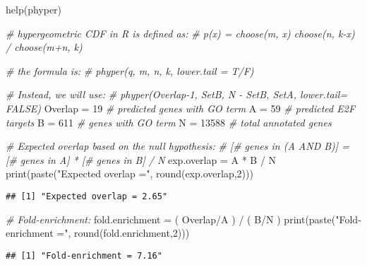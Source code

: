 \documentclass[
]{article}
\newenvironment{Shaded}{\begin{snugshade}}{\end{snugshade}}
\newcommand{\CommentTok}[1]{\textcolor[rgb]{0.56,0.35,0.01}{\textit{#1}}}
\newcommand{\DecValTok}[1]{\textcolor[rgb]{0.00,0.00,0.81}{#1}}
\newcommand{\FunctionTok}[1]{\textcolor[rgb]{0.00,0.00,0.00}{#1}}
\newcommand{\NormalTok}[1]{#1}
\newcommand{\OtherTok}[1]{\textcolor[rgb]{0.56,0.35,0.01}{#1}}
\newcommand{\SpecialCharTok}[1]{\textcolor[rgb]{0.00,0.00,0.00}{#1}}
\newcommand{\StringTok}[1]{\textcolor[rgb]{0.31,0.60,0.02}{#1}}
\begin{document}
\begin{Shaded}
\begin{Highlighting}[]
\FunctionTok{help}\NormalTok{(phyper)}

\CommentTok{\# hypergeometric CDF in R is defined as: }
\CommentTok{\#   p(x) = choose(m, x) choose(n, k{-}x) / choose(m+n, k)}

\CommentTok{\# the formula is:}
\CommentTok{\#   phyper(q, m, n, k, lower.tail = T/F)}

\CommentTok{\# Instead, we will use: }
\CommentTok{\#   phyper(Overlap{-}1, SetB, N {-} SetB, SetA, lower.tail= FALSE)}
\NormalTok{Overlap }\OtherTok{=} \DecValTok{19}  \CommentTok{\# predicted genes with GO term}
\NormalTok{A }\OtherTok{=} \DecValTok{59}     \CommentTok{\# predicted E2F targets}
\NormalTok{B }\OtherTok{=} \DecValTok{611}    \CommentTok{\# genes with GO term}
\NormalTok{N }\OtherTok{=} \DecValTok{13588}     \CommentTok{\# total annotated genes}

\CommentTok{\# Expected overlap based on the null hypothesis:}
\CommentTok{\# [\# genes in (A AND B)] = [\# genes in A] * [\# genes in B] / N}
\NormalTok{exp.overlap }\OtherTok{=}\NormalTok{ A }\SpecialCharTok{*}\NormalTok{ B }\SpecialCharTok{/}\NormalTok{ N}
\FunctionTok{print}\NormalTok{(}\FunctionTok{paste}\NormalTok{(}\StringTok{"Expected overlap ="}\NormalTok{, }\FunctionTok{round}\NormalTok{(exp.overlap,}\DecValTok{2}\NormalTok{)))}
\end{Highlighting}
\end{Shaded}

\begin{verbatim}
## [1] "Expected overlap = 2.65"
\end{verbatim}

\begin{Shaded}
\begin{Highlighting}[]
\CommentTok{\# Fold{-}enrichment:}
\NormalTok{fold.enrichment }\OtherTok{=}\NormalTok{ ( Overlap}\SpecialCharTok{/}\NormalTok{A ) }\SpecialCharTok{/}\NormalTok{ ( B}\SpecialCharTok{/}\NormalTok{N )}
\FunctionTok{print}\NormalTok{(}\FunctionTok{paste}\NormalTok{(}\StringTok{"Fold{-}enrichment ="}\NormalTok{, }\FunctionTok{round}\NormalTok{(fold.enrichment,}\DecValTok{2}\NormalTok{)))}
\end{Highlighting}
\end{Shaded}

\begin{verbatim}
## [1] "Fold-enrichment = 7.16"
\end{verbatim}
\end{document}
